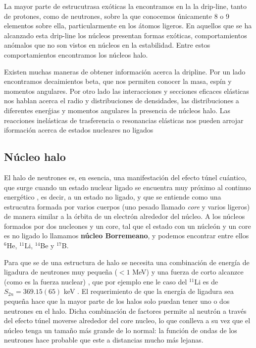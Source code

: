 La mayor parte de estrucutrasa exóticas la encontramos en la la drip-line, tanto de protones, como de neutrones, sobre la que conocemos únicamente 8 o 9 elementos sobre ella, particularmente en los átomos ligeros. En aquellos que se ha alcanzado esta drip-line los núcleos presentan formas exóticas, comportamientos anómalos que no son vistos en núcleos en la estabilidad. Entre estos comportamientos encontramos los núcleos halo. 

Existen muchas maneras de obtener información acerca la dripline. Por un lado encontramos decaimientos beta, que nos permiten conocer la masa, espín y momentos angulares. Por otro lado las interacciones y secciones eficaces elásticas nos hablan acerca el radio y distribuciones de densidades, las distribuciones a diferentes enerǵias y momentos angulares la presencia de núcleos halo. Las reacciones inelásticas de trasferencia o resonancias elásticas nos pueden arrojar iformación acerca de estados nucleares no ligados \cite{JONSON20041}


\subsection{Núcleo halo}


El halo de neutrones es, en esencia, una manifestación del efecto túnel cuántico, que surge cuando un estado nuclear ligado se encuentra muy próximo al continuo energético \cite{tanihata2023halo}, es decir, a un estado no ligado, y que se entiende como una estrucutra formada por varios cuerpos (uno pesado llamado \textit{core} y varios ligeros) de manera similar a la órbita de un electrón alrededor del núcleo. A los núcleos formados por dos nucleones y un core, tal que el estado con un núcleón y un core es no ligado \cite{tanihata2023lowEnergyHalo} lo llamamos \textbf{núcleo Borremeano}, y podemos encontrar entre ellos $^6$He, $^{11}$Li, $^{14}$Be y $^{17}$B. 



Para que se de una estructura de halo se necesita una combinación de energía de ligadura de neutrones muy pequeña ($<1$ MeV) y una fuerza de corto alcanzce (como es la fuerza nuclear) \cite{tanihata2023halo}, que por ejemplo ene le caso del $^{11}$Li es de $S_{2n}=369.15(65)$ keV \cite{PhysRevLett.101.202501}. El requerimiento de que la energía de ligadura sea pequeña hace que la mayor parte de los halos solo puedan tener uno o dos neutrones en el halo. Dicha combinación de factores permite al neutrón a través del efecto túnel moverse alrededor del core nucleo, lo que conlleva a su vez que el núcleo tenga un tamaño más grande de lo normal: la función de ondas de los neutrones hace probable que este a distancias mucho más lejanas. 

